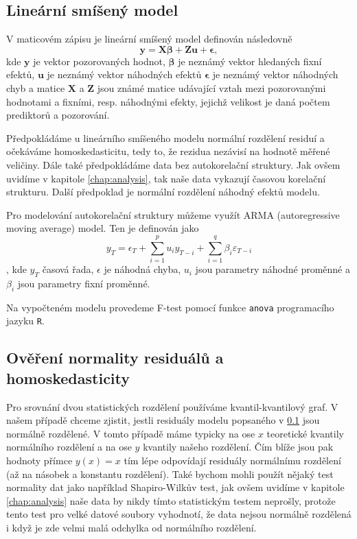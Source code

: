 \subsection{Lineární smíšený model}\label{chap:lme}
V maticovém zápisu je lineární smíšený model definován následovně\cite{mcleanrobert1991}
$$\boldsymbol{y} = \boldsymbol{X}\boldsymbol{\beta} + \boldsymbol{Z}\boldsymbol{u} + \boldsymbol{\epsilon},$$ \label{eq:linearmixedeffectmodel}
kde $\mathbf{y}$ je vektor pozorovaných hodnot, $\mathbf{\beta}$ je neznámý vektor hledaných fixní efektů, $\mathbf{u}$ je neznámý vektor náhodných efektů $\mathbf{\epsilon}$ je neznámý vektor náhodných chyb a matice $\mathbf{X}$ a $\mathbf{Z}$ jsou známé matice udávající vztah mezi pozorovanými hodnotami a fixními, resp. náhodnými efekty, jejichž velikost je daná počtem prediktorů a pozorování\cite{mcleanrobert1991}.

Předpokládáme u lineárního smíšeného modelu normální rozdělení residuí a očekáváme homoskedasticitu, tedy to, že rezidua nezávisí na hodnotě měřené veličiny. Dále také předpokládáme data bez autokorelační struktury. Jak ovšem uvidíme v kapitole \ref{chap:analysis}, tak naše data vykazují časovou korelační strukturu. Další předpoklad je normální rozdělení náhodný efektů modelu\cite{hefleytrevorj2017}. 

Pro modelování autokorelační struktury můžeme využít ARMA (autoregressive moving average) model. Ten je definován jako\cite{wilsongranville2016}
$$y_T = \epsilon_T + \sum_{i=1}^{p}u_i y_{T-i} + \sum_{i=1}^{q}\beta_i\varepsilon_{T-i}$$,
kde $y_T$ časová řada, $\epsilon$ je náhodná chyba, $u_i$ jsou parametry náhodné proměnné a $\beta_i$ jsou parametry fixní proměnné. 

Na vypočteném modelu provedeme F-test pomocí funkce \texttt{anova} programacího jazyku \texttt{R}.

\subsection{Ověření normality residuálů a homoskedasticity}
Pro srovnání dvou statistických rozdělení používáme kvantil-kvantilový graf. V našem případě chceme zjistit, jestli residuály modelu popsaného v \ref{chap:lme} jsou normálně rozdělené. V tomto případě máme typicky na ose $x$ teoretické kvantily normálního rozdělení a na ose $y$ kvantily našeho rozdělení. Čím blíže jsou pak hodnoty přímce $y(x)=x$ tím lépe odpovídají residuály normálnímu rozdělení (až na násobek a konstantu rozdělení)\cite{qqplot}. Také bychom mohli použít nějaký test normality dat jako například Shapiro-Wilkův test, jak ovšem uvidíme v kapitole \ref{chap:analysis} naše data by nikdy tímto statistickým testem neprošly, protože tento test pro velké datové soubory vyhodnotí, že data nejsou normálně rozdělená i když je zde velmi malá odchylka od normálního rozdělení\cite{shapirowilk}. 

